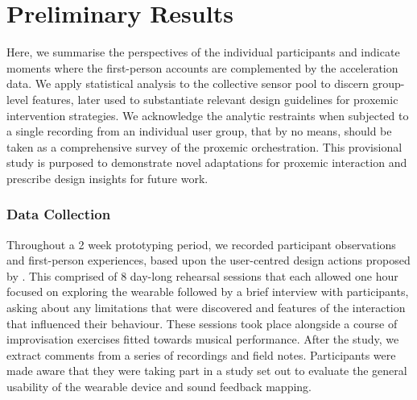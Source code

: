 
\section{Preliminary Results}
\label{sec:results}

Here, we summarise the perspectives of the individual participants and indicate moments where the first-person accounts are complemented by the acceleration data. We apply statistical analysis to the collective sensor pool to discern group-level features, later used to substantiate relevant design guidelines for proxemic intervention strategies. We acknowledge the analytic restraints when subjected to a single recording from an individual user group, that by no means, should be taken as a comprehensive survey of the proxemic orchestration. This provisional study is purposed to demonstrate novel adaptations for proxemic interaction and prescribe design insights for future work.


\subsubsection{Data Collection}
\label{sec:data_collection}

Throughout a 2 week prototyping period, we recorded participant observations and first-person experiences, based upon the user-centred design actions proposed by \citeauthor{bernardo_user-centred_2018} \cite{bernardo_user-centred_2018}. This comprised of 8 day-long rehearsal sessions that each allowed one hour focused on exploring the wearable followed by a brief interview with participants, asking about any limitations that were discovered and features of the interaction that influenced their behaviour. These sessions took place alongside a course of improvisation exercises fitted towards musical performance. After the study, we extract comments from a series of recordings and field notes. Participants were made aware that they were taking part in a study set out to evaluate the general usability of the wearable device and sound feedback mapping.

